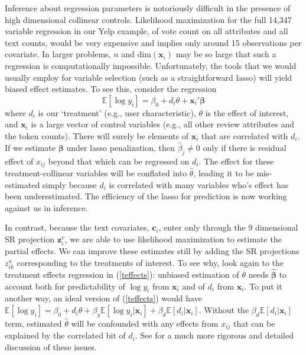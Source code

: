 \documentclass[12pt]{article}
\newcommand{\bs}[1]{\boldsymbol{#1}}
\newcommand{\mr}[1]{\mathrm{#1}}
\newcommand{\bm}[1]{\mathbf{#1}}
\newcommand{\ds}[1]{\mathds{#1}}
\begin{document}
Inference about regression parameters is notoriously difficult in the presence of high dimensional collinear controls.  Likelihood maximization for the full 14,347
variable regression in our Yelp example, of vote count on all attributes and all text counts,  would be very expensive and implies only around 15 observations per covariate.  
In larger problems, $n$ and $\mr{dim}(\bm{x}_i)$ may be so large that such a regression is computationally impossible.
Unfortunately, the tools that we would usually employ for variable selection (such as a straightforward lasso) will yield biased effect estimates.  To see this, consider
the regression 
\begin{equation}\label{teffects}
\ds{E}[\log y_i] = \beta_0 + d_i\theta  + \bm{x}_i'\bs{\beta}
\end{equation}
where $d_i$ is our `treatment' (e.g., user characteristic), $\theta$ is
the effect of interest, and $\bm{x}_i$ is a large vector of control
variables (e.g., all other review attributes and the token counts).   There
will surely be elements of $\bm{x}_i$ that are correlated with $d_i$. If
we estimate $\bs{\beta}$ under lasso penalization, 
then $\hat\beta_j \neq 0$ only if there is 
residual effect of $x_{ij}$ beyond that which can be regressed on $d_i$.  The
 effect for these treatment-collinear variables will be conflated
into $\hat\theta$, leading it to be mis-estimated simply because $d_i$ is correlated with many
variables who's effect has been underestimated.  The efficiency of the lasso
for prediction is now working against us in inference.

In contrast, because the text covariates, $\bm{c}_i$, enter only through the 9
dimensional SR projection $\bm{z}^v_i$, we are able to use likelihood maximization
 to estimate the partial effects.
We can improve these estimates still by adding the SR
projections $z^u_{ik}$ corresponding to the treatments of interest.    To see why, look
again to the treatment effects regression in (\ref{teffects}): 
unbiased estimation of $\theta$ needs $\bs{\hat\beta}$ to account both for
predictability of $\log y_i$ from $\bm{x}_i$ and of $d_i$ from $\bm{x}_i$.  To
put it another way, an ideal version of (\ref{teffects}) would have $\ds{E}[\log y_i] = \beta_0 + d_i\theta  + \beta_y \ds{E}[\log y_i
| \bm{x}_i] + \beta_d \ds{E}[d_i | \bm{x}_i]$.  Without the $\beta_d \ds{E}[d_i | \bm{x}_i]$ 
term, estimated $\hat\theta$ will be confounded with any effects from
$x_{ij}$ that can be explained by the correlated bit of $d_i$.  See
\citet{belloni_inference_2012} for a much more rigorous and detailed
discussion of these issues.
\end{document}
